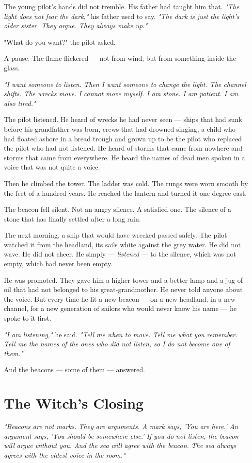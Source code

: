 The young pilot's hands did not tremble. His father had taught him that. \textit{"The light does not fear the dark,"} his father used to say. \textit{"The dark is just the light's older sister. They argue. They always make up."}

"What do you want?" the pilot asked.

A pause. The flame flickered — not from wind, but from something inside the glass.

\textit{"I want someone to listen. Then I want someone to change the light. The channel shifts. The wrecks move. I cannot move myself. I am stone. I am patient. I am also tired."}

The pilot listened. He heard of wrecks he had never seen — ships that had sunk before his grandfather was born, crews that had drowned singing, a child who had floated ashore in a bread trough and grown up to be the pilot who replaced the pilot who had not listened. He heard of storms that came from nowhere and storms that came from everywhere. He heard the names of dead men spoken in a voice that was not quite a voice.

Then he climbed the tower. The ladder was cold. The rungs were worn smooth by the feet of a hundred years. He reached the lantern and turned it one degree east.

The beacon fell silent. Not an angry silence. A satisfied one. The silence of a stone that has finally settled after a long rain.

The next morning, a ship that would have wrecked passed safely. The pilot watched it from the headland, its sails white against the grey water. He did not wave. He did not cheer. He simply — \textit{listened} — to the silence, which was not empty, which had never been empty.

He was promoted. They gave him a higher tower and a better lamp and a jug of oil that had not belonged to his great-grandmother. He never told anyone about the voice. But every time he lit a new beacon — on a new headland, in a new channel, for a new generation of sailors who would never know his name — he spoke to it first.

\textit{"I am listening,"} he said. \textit{"Tell me when to move. Tell me what you remember. Tell me the names of the ones who did not listen, so I do not become one of them."}

And the beacons — some of them — answered.

\section*{The Witch's Closing}
\textit{"Beacons are not marks. They are arguments. A mark says, 'You are here.' An argument says, 'You should be somewhere else.' If you do not listen, the beacon will argue without you. And the sea will agree with the beacon. The sea always agrees with the oldest voice in the room."}

